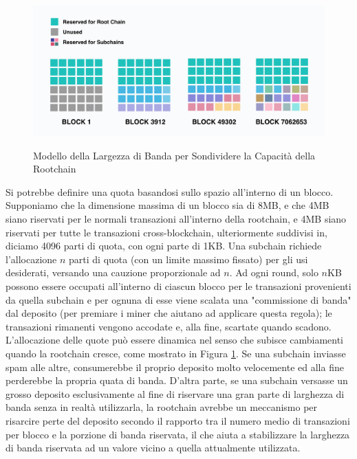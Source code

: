 \documentclass[a4paper,12pt]{article}
\begin{document}
\begin{figure}[ht]
	\includegraphics[width=\textwidth]{Figura3.png}
	\label{fig:fig3}
	\caption{Modello della Largezza di Banda per Sondividere la Capacità della Rootchain}
\end{figure}

Si potrebbe definire una quota basandosi sullo spazio all'interno di un blocco. Supponiamo che la dimensione massima di un blocco sia di 8MB, e che 4MB siano riservati per le normali transazioni all'interno della rootchain, e 4MB siano riservati per tutte le transazioni cross-blockchain, ulteriormente suddivisi in, diciamo 4096 parti di quota, con ogni parte di 1KB. Una subchain richiede l'allocazione $n$ parti di quota (con un limite massimo fissato) per gli usi desiderati, versando una cauzione proporzionale ad $n$. Ad ogni round, solo $n$KB possono essere occupati all'interno di ciascun blocco per le transazioni provenienti da quella subchain e per ognuna di esse viene scalata una "commissione di banda" dal deposito (per premiare i miner che aiutano ad applicare questa regola); le transazioni rimanenti vengono accodate e, alla fine, scartate quando scadono. L'allocazione delle quote può essere dinamica nel senso che subisce cambiamenti quando la rootchain cresce, come mostrato in Figura \ref{fig:fig3}. Se una subchain inviasse spam alle altre, consumerebbe il proprio deposito molto velocemente ed alla fine perderebbe la propria quata di banda. D'altra parte, se una subchain versasse un grosso deposito esclusivamente al fine di riservare una gran parte di larghezza di banda senza in realtà utilizzarla, la rootchain avrebbe un meccanismo per risarcire perte del deposito secondo il rapporto tra il numero medio di transazioni per blocco e la porzione di banda riservata, il che aiuta a stabilizzare la larghezza di banda riservata ad un valore vicino a quella attualmente utilizzata.

\pagebreak




\end{document}
